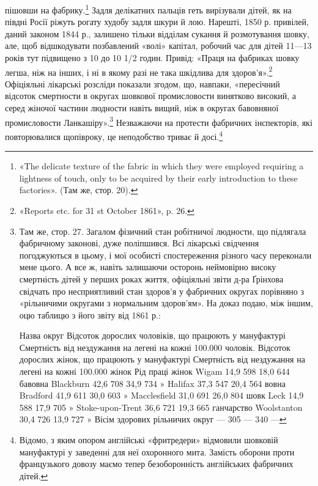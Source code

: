 \parcont{}  %
пішовши на фабрику.\footnote{
«The delicate texture of the fabric in which they were employed
requiring a lightness of touch, only to be acquired by their early introduction
to these factories». (Там же, стор. 20).
} Задля делікатних пальців геть вирізували
дітей, як на півдні Росії ріжуть рогату худобу задля шкури
й лою. Нарешті, 1850 р. привілей, даний законом 1844 р., залишено
тільки відділам сукання й розмотування шовку, але, щоб
відшкодувати позбавлений «волі» капітал, робочий час для дітей
11—13 років тут підвищено з 10 до 10 1/2 годин. Привід: «Праця
на фабриках шовку легша, ніж на інших, і ні в якому разі не така
шкідлива для здоров’я».\footnote{
«Reports etc. for 31 st October 1861», p. 26.
} Офіціяльні лікарські розсліди показали
згодом, що, навпаки, «пересічний відсоток смертности в
округах шовкової промисловости винятково високий, а серед жіночої
частини людности навіть вищий, ніж в округах бавовняної
промисловости Ланкашіру».\footnote{
Там же, стор. 27. Загалом фізичний стан робітничої людности,
що підлягала фабричному законові, дуже поліпшився. Всі лікарські
свідчення погоджуються в цьому, і мої особисті спостереження різного
часу переконали мене цього. А все ж, навіть залишаючи осторонь неймовірно
високу смертність дітей у перших роках життя, офіціяльні
звіти д-ра Ґрінхова свідчать про несприятливий стан здоров’я у фабричних
округах порівняно з «рільничими округами з нормальним здоров'ям».
На доказ подаю, між іншим, оцю таблицю з його звіту від 1861 р.:

Назва округ    Відсоток дорослих чоловіків, що працюють у мануфактурі    Смертність від нездужання
на легені на кожні 100.000 чоловік. Відсоток дорослих жінок, що працюють у мануфактурі    Смертність
від нездужання на легені на кожні 100.000 жінок    Рід праці жінок
Wigam                        14,9     598    18,0     644    бавовна
Blackburn                   42,6     708    34,9     734          »
Halifax                        37,3      547    20,4     564     вовна
Bradford                      41,9     611   30,0    603         »
Macclesfield               31,0     691    26,0     804      шовк
Leck                             14,9     588    17,9     705           »
Stoke-upon-Trent     36,6    721    19,3     665    ганчарство
Woolstanton              30,4    726    13,9      727           »
Вісім здорових
рільничих округ       —       305   —        340            —
} Незважаючи на протести фабричних
інспекторів, які повторювалися щопівроку, це неподобство
триває й досі.\footnote{
Відомо, з яким опором англійські «фритредери» відмовили шовковій
мануфактурі у заведенні для неї охоронного мита. Замість оборони
проти французького довозу маємо тепер безоборонність англійських фабричних
дітей.
}
